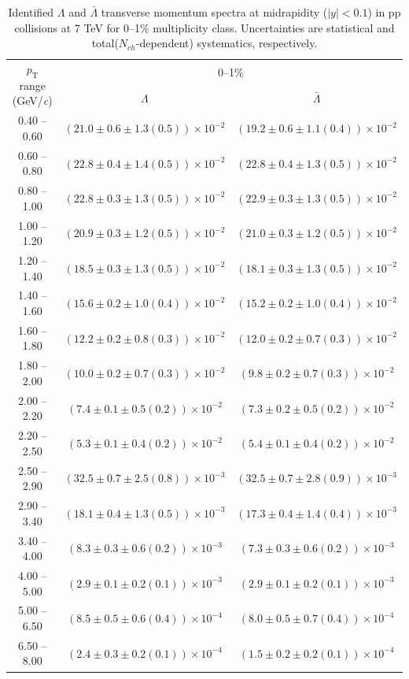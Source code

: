 \begin{table}
\caption{Identified $\Lambda$ and $\bar{\Lambda}$  transverse momentum spectra at midrapidity ($|y|<0.1$) in pp collisions at 7 TeV for 0--1\% multiplicity class. Uncertainties are statistical and total($N_{ch}$-dependent) systematics, respectively.}
\label{tab:Lambda_AntiLambda_0to1}
\begin{center}
\begin{tabular}{ c | c c }
\hline
\multirow{2}{*}{$p_{\mathrm{T}}$ range (GeV/\textit{c})} & \multicolumn{2}{c}{0--1\%} \\ & $\Lambda$& $\bar{\Lambda}$\\ 
\hline
0.40 -- 0.60 & $(21.0\pm0.6\pm1.3(0.5))\times10^{-2}$ & $(19.2\pm0.6\pm1.1(0.4))\times10^{-2}$ \\ 
0.60 -- 0.80 & $(22.8\pm0.4\pm1.4(0.5))\times10^{-2}$ & $(22.8\pm0.4\pm1.3(0.5))\times10^{-2}$ \\ 
0.80 -- 1.00 & $(22.8\pm0.3\pm1.3(0.5))\times10^{-2}$ & $(22.9\pm0.3\pm1.3(0.5))\times10^{-2}$ \\ 
1.00 -- 1.20 & $(20.9\pm0.3\pm1.2(0.5))\times10^{-2}$ & $(21.0\pm0.3\pm1.2(0.5))\times10^{-2}$ \\ 
1.20 -- 1.40 & $(18.5\pm0.3\pm1.3(0.5))\times10^{-2}$ & $(18.1\pm0.3\pm1.3(0.5))\times10^{-2}$ \\ 
1.40 -- 1.60 & $(15.6\pm0.2\pm1.0(0.4))\times10^{-2}$ & $(15.2\pm0.2\pm1.0(0.4))\times10^{-2}$ \\ 
1.60 -- 1.80 & $(12.2\pm0.2\pm0.8(0.3))\times10^{-2}$ & $(12.0\pm0.2\pm0.7(0.3))\times10^{-2}$ \\ 
1.80 -- 2.00 & $(10.0\pm0.2\pm0.7(0.3))\times10^{-2}$ & $(9.8\pm0.2\pm0.7(0.3))\times10^{-2}$ \\ 
2.00 -- 2.20 & $(7.4\pm0.1\pm0.5(0.2))\times10^{-2}$ & $(7.3\pm0.2\pm0.5(0.2))\times10^{-2}$ \\ 
2.20 -- 2.50 & $(5.3\pm0.1\pm0.4(0.2))\times10^{-2}$ & $(5.4\pm0.1\pm0.4(0.2))\times10^{-2}$ \\ 
2.50 -- 2.90 & $(32.5\pm0.7\pm2.5(0.8))\times10^{-3}$ & $(32.5\pm0.7\pm2.8(0.9))\times10^{-3}$ \\ 
2.90 -- 3.40 & $(18.1\pm0.4\pm1.3(0.5))\times10^{-3}$ & $(17.3\pm0.4\pm1.4(0.4))\times10^{-3}$ \\ 
3.40 -- 4.00 & $(8.3\pm0.3\pm0.6(0.2))\times10^{-3}$ & $(7.3\pm0.3\pm0.6(0.2))\times10^{-3}$ \\ 
4.00 -- 5.00 & $(2.9\pm0.1\pm0.2(0.1))\times10^{-3}$ & $(2.9\pm0.1\pm0.2(0.1))\times10^{-3}$ \\ 
5.00 -- 6.50 & $(8.5\pm0.5\pm0.6(0.4))\times10^{-4}$ & $(8.0\pm0.5\pm0.7(0.4))\times10^{-4}$ \\ 
6.50 -- 8.00 & $(2.4\pm0.3\pm0.2(0.1))\times10^{-4}$ & $(1.5\pm0.2\pm0.2(0.1))\times10^{-4}$ \\ 
\hline
\end{tabular}
\end{center}
\end{table}
 
